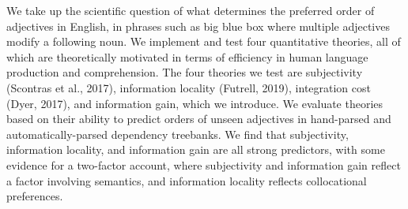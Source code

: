 We take up the scientific question of what determines the preferred order of adjectives in English, in phrases such as big blue box where multiple adjectives modify a following noun. We implement and test four quantitative theories, all of which are theoretically motivated in terms of efficiency in human language production and comprehension. The four theories we test are subjectivity (Scontras et al., 2017), information locality (Futrell, 2019), integration cost (Dyer, 2017), and information gain, which we introduce. We evaluate theories based on their ability to predict orders of unseen adjectives in hand-parsed and automatically-parsed dependency treebanks. We find that subjectivity, information locality, and information gain are all strong predictors, with some evidence for a two-factor account, where subjectivity and information gain reflect a factor involving semantics, and information locality reflects collocational preferences.
